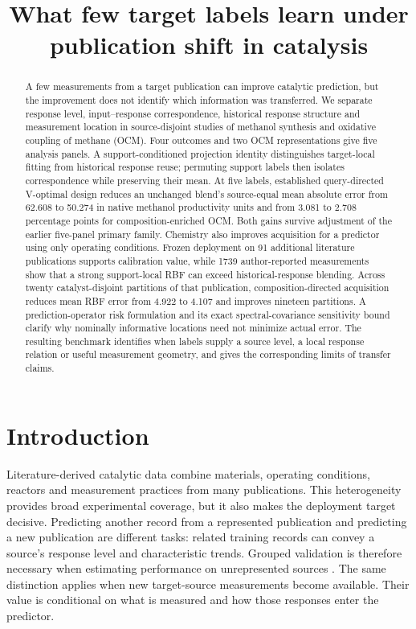 \documentclass[11pt]{article}
\title{What few target labels learn under publication shift in catalysis}
\author{}\date{}
\begin{document}
\maketitle
\begin{abstract}
A few measurements from a target publication can improve catalytic prediction, but the improvement does not identify which information was transferred. We separate response level, input--response correspondence, historical response structure and measurement location in source-disjoint studies of methanol synthesis and oxidative coupling of methane (OCM). Four outcomes and two OCM representations give five analysis panels. A support-conditioned projection identity distinguishes target-local fitting from historical response reuse; permuting support labels then isolates correspondence while preserving their mean. At five labels, established query-directed V-optimal design reduces an unchanged blend's source-equal mean absolute error from 62.608 to 50.274 in native methanol productivity units and from 3.081 to 2.708 percentage points for composition-enriched OCM. Both gains survive adjustment of the earlier five-panel primary family. Chemistry also improves acquisition for a predictor using only operating conditions. Frozen deployment on 91 additional literature publications supports calibration value, while 1739 author-reported measurements show that a strong support-local RBF can exceed historical-response blending. Across twenty catalyst-disjoint partitions of that publication, composition-directed acquisition reduces mean RBF error from 4.922 to 4.107 and improves nineteen partitions. A prediction-operator risk formulation and its exact spectral-covariance sensitivity bound clarify why nominally informative locations need not minimize actual error. The resulting benchmark identifies when labels supply a source level, a local response relation or useful measurement geometry, and gives the corresponding limits of transfer claims.
\end{abstract}

\section{Introduction}
Literature-derived catalytic data combine materials, operating conditions, reactors and measurement practices from many publications. This heterogeneity provides broad experimental coverage, but it also makes the deployment target decisive. Predicting another record from a represented publication and predicting a new publication are different tasks: related training records can convey a source's response level and characteristic trends. Grouped validation is therefore necessary when estimating performance on unrepresented sources \cite{roberts}. The same distinction applies when new target-source measurements become available. Their value is conditional on what is measured and how those responses enter the predictor.
\end{document}
